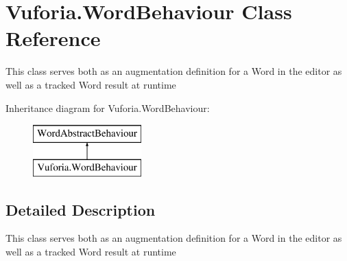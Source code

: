 \hypertarget{class_vuforia_1_1_word_behaviour}{}\section{Vuforia.\+Word\+Behaviour Class Reference}
\label{class_vuforia_1_1_word_behaviour}


This class serves both as an augmentation definition for a Word in the editor as well as a tracked Word result at runtime  


Inheritance diagram for Vuforia.\+Word\+Behaviour\+:\begin{figure}[H]
\begin{center}
\leavevmode
\includegraphics[height=2.000000cm]{class_vuforia_1_1_word_behaviour}
\end{center}
\end{figure}


\subsection{Detailed Description}
This class serves both as an augmentation definition for a Word in the editor as well as a tracked Word result at runtime 

